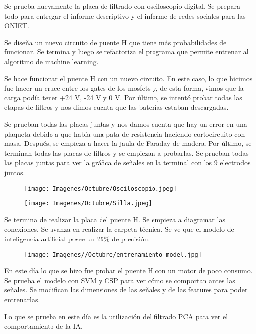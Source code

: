 \documentclass{article}
\begin{document}
Se prueba nuevamente la placa de filtrado con osciloscopio digital. Se prepara todo para entregar el informe descriptivo y el informe de redes sociales para las ONIET.



Se diseña un nuevo circuito de puente H que tiene más probabilidades de funcionar. Se termina y luego se refactoriza el programa que permite entrenar al algoritmo de machine learning.



Se hace funcionar el puente H con un nuevo circuito. En este caso, lo que hicimos fue hacer un cruce entre los gates de los mosfets y, de esta forma, vimos que la carga podía tener +24 V, -24 V y 0 V. Por último, se intentó probar todas las etapas de filtros y nos dimos cuenta que las baterías estaban descargadas.

\newpage

Se prueban todas las placas juntas y nos damos cuenta que hay un error en una plaqueta debido a que había una pata de resistencia haciendo cortocircuito con masa. Después, se empieza a hacer la jaula de Faraday de madera. Por último, se terminan todas las placas de filtros y se empiezan a probarlas. Se prueban todas las placas juntas para ver la gráfica de señales en la terminal con los 9 electrodos juntos.

\begin{figure}[H]
    \centering
    \texttt{[image: Imagenes/Octubre/Osciloscopio.jpeg]}
\end{figure}


\begin{figure}[H]
    \centering
    \texttt{[image: Imagenes/Octubre/Silla.jpeg]}
\end{figure}

Se termina de realizar la placa del puente H. Se empieza a diagramar las conexiones. Se avanza en realizar la carpeta técnica. Se ve que el modelo de inteligencia artificial posee un 25\% de precisión.

\begin{figure}[H]
    \centering
    \texttt{[image: Imagenes//Octubre/entrenamiento model.jpg]}
\end{figure}

En este día lo que se hizo fue probar el puente H con un motor de poco consumo. Se prueba el modelo con SVM y CSP para ver cómo se comportan antes las señales. Se modifican las dimensiones de las señales y de las features para poder entrenarlas.



Lo que se prueba en este día es la utilización del filtrado PCA para ver el comportamiento de la IA.


\newpage
\end{document}
